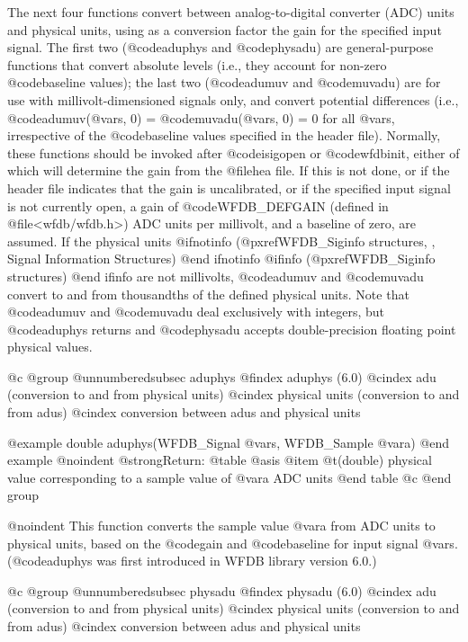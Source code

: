{{{{{{{{The next four functions convert between analog-to-digital converter
(ADC) units and physical units, using as a conversion factor the gain
for the specified input signal.  The first two (@code{aduphys} and
@code{physadu}) are general-purpose functions that convert absolute
levels (i.e., they account for non-zero @code{baseline} values); the
last two (@code{adumuv} and @code{muvadu}) are for use with
millivolt-dimensioned signals only, and convert potential differences
(i.e., @code{adumuv(@var{s}, 0)} = @code{muvadu(@var{s}, 0)} = 0 for all
@var{s}, irrespective of the @code{baseline} values specified in the
header file).  Normally, these functions should be invoked after
@code{isigopen} or @code{wfdbinit}, either of which will determine the
gain from the @file{hea} file.  If this is not done, or if the
header file indicates that the gain is uncalibrated, or if the
specified input signal is not currently open, a gain of @code{WFDB_DEFGAIN}
(defined in @file{<wfdb/wfdb.h>}) ADC units per millivolt, and a baseline
of zero, are assumed.  If the physical units
@ifnotinfo
(@pxref{WFDB_Siginfo structures, , Signal Information Structures})
@end ifnotinfo
@ifinfo
(@pxref{WFDB_Siginfo structures})
@end ifinfo
are not millivolts, @code{adumuv} and @code{muvadu} convert to and from
thousandths of the defined physical units.  Note that @code{adumuv} and
@code{muvadu} deal exclusively with integers, but @code{aduphys} returns
and @code{physadu} accepts double-precision floating point physical
values.

@c @group
@unnumberedsubsec aduphys
@findex aduphys (6.0)
@cindex adu (conversion to and from physical units)
@cindex physical units (conversion to and from adus)
@cindex conversion between adus and physical units

@example
double aduphys(WFDB_Signal @var{s}, WFDB_Sample @var{a})
@end example
@noindent
@strong{Return:}
@table @asis
@item @t{(double)}
physical value corresponding to a sample value of @var{a} ADC units
@end table
@c @end group

@noindent
This function converts the sample value @var{a} from ADC units to
physical units, based on the @code{gain} and @code{baseline} for input
signal @var{s}.  (@code{aduphys} was first introduced in WFDB library
version 6.0.)

@c @group
@unnumberedsubsec physadu
@findex physadu (6.0)
@cindex adu (conversion to and from physical units)
@cindex physical units (conversion to and from adus)
@cindex conversion between adus and physical units

}}}}}}}}
